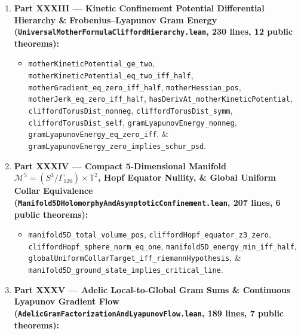 \documentclass[
  11pt,
]{article}
\providecommand{\tightlist}{%
  \setlength{\itemsep}{0pt}\setlength{\parskip}{0pt}}
\begin{document}
\begin{enumerate}
  \begin{itemize}
  \tightlist
  \item
    \texttt{splitPhasor\_hyperbolic\_factorization},
    \texttt{minkowski\_null\_cone\_iff\_dipolar\_zero},
    \texttt{clifford\_minkowski\_pseudonorm\_eq\_one},
    \texttt{clifford\_phase\_energy\_ge\_one},
    \texttt{clifford\_equator\_energy\_min\_iff\_half},
    \texttt{clifford\_torus\_unit\_sphere\_iff\_half},
    \texttt{cliffordVonMangoldtCoupling\_eq\_zero\_on\_critical\_line},
    \texttt{cliffordVonMangoldtCoupling\_odd\_in\_beta},
    \texttt{cliffordTorusEquatorialZeroTarget\_iff\_riemannHypothesis},
    \texttt{routeA\_gram\_factorization\_implies\_psd}, \&
    \texttt{routeA\_all\_horizon\_gram\_iff\_schur\_psd}.
  \end{itemize}
\item
  \textbf{Part XXXIII --- Kinetic Confinement Potential Differential
  Hierarchy \& Frobenius--Lyapunov Gram Energy
  (\texttt{UniversalMotherFormulaCliffordHierarchy.lean}, 230 lines, 12
  public theorems):}

  \begin{itemize}
  \tightlist
  \item
    \texttt{motherKineticPotential\_ge\_two},
    \texttt{motherKineticPotential\_eq\_two\_iff\_half},
    \texttt{motherGradient\_eq\_zero\_iff\_half},
    \texttt{motherHessian\_pos},
    \texttt{motherJerk\_eq\_zero\_iff\_half},
    \texttt{hasDerivAt\_motherKineticPotential},
    \texttt{cliffordTorusDist\_nonneg},
    \texttt{cliffordTorusDist\_symm}, \texttt{cliffordTorusDist\_self},
    \texttt{gramLyapunovEnergy\_nonneg},
    \texttt{gramLyapunovEnergy\_eq\_zero\_iff}, \&
    \texttt{gramLyapunovEnergy\_zero\_implies\_schur\_psd}.
  \end{itemize}
\item
  \textbf{Part XXXIV --- Compact 5-Dimensional Manifold
  \(\mathcal{M}^5 = (S^3/\Gamma_{120}) \times \mathbb{T}^2\), Hopf
  Equator Nullity, \& Global Uniform Collar Equivalence
  (\texttt{Manifold5DHolomorphyAndAsymptoticConfinement.lean}, 207
  lines, 6 public theorems):}

  \begin{itemize}
  \tightlist
  \item
    \texttt{manifold5D\_total\_volume\_pos},
    \texttt{cliffordHopf\_equator\_z3\_zero},
    \texttt{cliffordHopf\_sphere\_norm\_eq\_one},
    \texttt{manifold5D\_energy\_min\_iff\_half},
    \texttt{globalUniformCollarTarget\_iff\_riemannHypothesis}, \&
    \texttt{manifold5D\_ground\_state\_implies\_critical\_line}.
  \end{itemize}
\item
  \textbf{Part XXXV --- Adelic Local-to-Global Gram Sums \& Continuous
  Lyapunov Gradient Flow
  (\texttt{AdelicGramFactorizationAndLyapunovFlow.lean}, 189 lines, 7
  public theorems):}


\end{enumerate}
\end{document}

